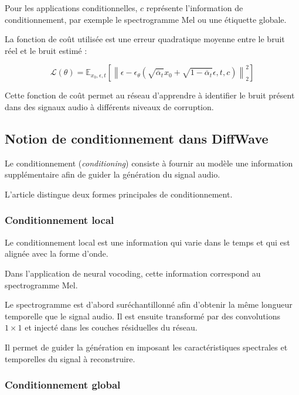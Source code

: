 Pour les applications conditionnelles, $c$ représente l'information
de conditionnement, par exemple le spectrogramme Mel ou une
étiquette globale.

La fonction de coût utilisée est une erreur quadratique moyenne
entre le bruit réel et le bruit estimé :

\begin{equation}
\mathcal{L}(\theta)
=
\mathbb{E}_{x_0,\epsilon,t}
\left[
\left\|
\epsilon -
\epsilon_\theta
\left(
\sqrt{\overline{\alpha}_t}x_0
+
\sqrt{1-\overline{\alpha}_t}\epsilon,
t,c
\right)
\right\|_2^2
\right]
\end{equation}

Cette fonction de coût permet au réseau d'apprendre à identifier
le bruit présent dans des signaux audio à différents niveaux
de corruption.

\subsection{Notion de conditionnement dans DiffWave}

Le conditionnement (\textit{conditioning}) consiste à fournir
au modèle une information supplémentaire afin de guider la
génération du signal audio.

L'article distingue deux formes principales de conditionnement.

\subsubsection{Conditionnement local}

Le conditionnement local est une information qui varie dans
le temps et qui est alignée avec la forme d'onde.

Dans l'application de neural vocoding, cette information
correspond au spectrogramme Mel.

Le spectrogramme est d'abord suréchantillonné afin d'obtenir
la même longueur temporelle que le signal audio. Il est ensuite
transformé par des convolutions $1\times1$ et injecté dans
les couches résiduelles du réseau.

Il permet de guider la génération en imposant les caractéristiques
spectrales et temporelles du signal à reconstruire.

\subsubsection{Conditionnement global}

